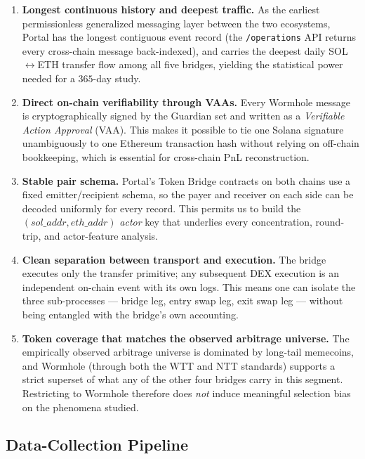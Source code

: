 \documentclass[11pt,a4paper]{article}
\begin{document}
\begin{enumerate}
    \item \textbf{Longest continuous history and deepest traffic.} As the
        earliest permissionless generalized messaging layer between the two
        ecosystems, Portal has the longest contiguous event record (the
        \texttt{/operations} API returns every cross-chain message
        back-indexed), and carries the deepest daily SOL$\leftrightarrow$ETH
        transfer flow among all five bridges, yielding the statistical power
        needed for a $365$-day study.
    \item \textbf{Direct on-chain verifiability through VAAs.} Every
        Wormhole message is cryptographically signed by the Guardian set and
        written as a \emph{Verifiable Action Approval} (VAA). This makes it
        possible to tie one Solana signature unambiguously to one Ethereum
        transaction hash without relying on off-chain bookkeeping, which is
        essential for cross-chain PnL reconstruction.
    \item \textbf{Stable pair schema.} Portal's Token Bridge contracts on
        both chains use a fixed emitter/recipient schema, so the payer and
        receiver on each side can be decoded uniformly for every record. This
        permits us to build the $(sol\_addr, eth\_addr)$ \emph{actor} key
        that underlies every concentration, round-trip, and actor-feature
        analysis.
    \item \textbf{Clean separation between transport and execution.} The
        bridge executes only the transfer primitive; any subsequent DEX
        execution is an independent on-chain event with its own logs. This
        means one can isolate the three sub-processes --- bridge leg, entry
        swap leg, exit swap leg --- without being entangled with the
        bridge's own accounting.
    \item \textbf{Token coverage that matches the observed arbitrage
        universe.} The empirically observed arbitrage universe is dominated
        by long-tail memecoins, and Wormhole (through both the WTT and NTT
        standards) supports a strict superset of what any of the other four
        bridges carry in this segment. Restricting to Wormhole therefore
        does \emph{not} induce meaningful selection bias on the phenomena
        studied.
\end{enumerate}

\subsection{Data-Collection Pipeline}
\label{sec:ch4-pipeline}
\end{document}
